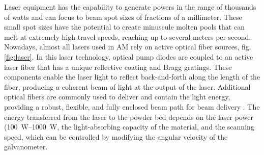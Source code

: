 Laser equipment has the capability to generate powers in the range of thousands of watts and can focus to beam spot sizes of fractions of a millimeter. These small spot sizes have the potential to create minuscule molten pools that can melt at extremely high travel speeds, reaching up to several meters per second. Nowadays, almost all lasers used in AM rely on active optical fiber sources, fig. \ref{fig:laser}. In this laser technology, optical pump diodes are coupled to an active laser fiber that has a unique reflective coating and Bragg gratings. These components enable the laser light to reflect back-and-forth along the length of the fiber, producing a coherent beam of light at the output of the laser. Additional optical fibers are commonly used to deliver and contain the light energy, providing a robust, flexible, and fully enclosed beam path for beam delivery \cite{milewski_additive_2017}. The energy transferred from the laser to the powder bed depends on the laser power (\SIrange[range-phrase = --]{100}{1000}{\watt}, the light-absorbing capacity of the material, and the scanning speed, which can be controlled by modifying the angular velocity of the galvanometer.

